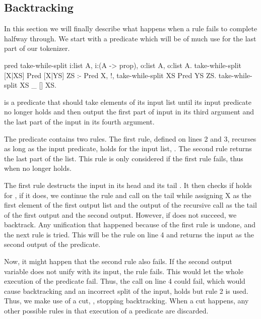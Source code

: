\documentclass[thesis.tex]{subfiles}
\begin{document}
{{\subsection{Backtracking} \label{sssec:backtracking}
In this section we will finally describe what happens when a rule fails to complete halfway through. We start with a predicate which will be of much use for the last part of our tokenizer.
\begin{elpicode}
  pred take-while-split i:list A, i:(A -> prop), 
                        o:list A, o:list A.
  take-while-split [X|XS] Pred [X|YS] ZS :- Pred X, !,
    take-while-split XS Pred YS ZS.
  take-while-split XS _ [] XS.
\end{elpicode}
 is a predicate that should take elements of its input list until its input predicate no longer holds and then output the first part of input in its third argument and the last part of the input in its fourth argument.

The predicate contains two rules. The first rule, defined on lines 2 and 3, recurses as long as the input predicate,  holds for the input list, \elpii{[X|XS]}. The second rule returns the last part of the list. This rule is only considered if the first rule fails, thus when  no longer holds.

The first rule destructs the input in its head  and its tail . It then checks if  holds for , if it does, we continue the rule and call  on the tail while assigning X as the first element of the first output list and the output of the recursive call as the tail of the first output and the second output. However, if  does not succeed, we backtrack. Any unification that happened because of the first rule is undone, and the next rule is tried. This will be the rule on line 4 and returns the input as the second output of the predicate.

Now, it might happen that the second rule also fails. If the second output variable does not unify with its input, the rule fails. This would let the whole execution of the predicate fail. Thus, the call on line 4 could fail, which would cause backtracking and an incorrect split of the input,  holds but rule 2 is used. Thus, we make use of a cut, \elpii{!}, stopping backtracking. When a cut happens, any other possible rules in that execution of a predicate are discarded.

}}
\end{document}
